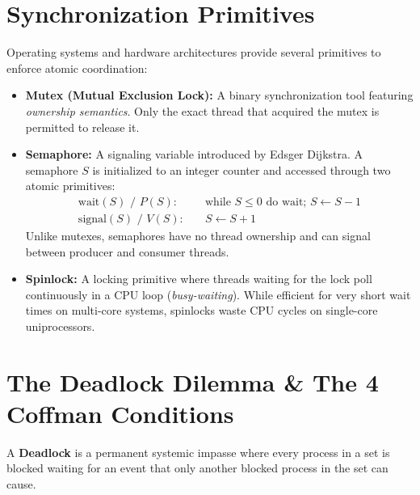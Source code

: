 \documentclass[11pt,a4paper]{article}
\begin{document}
\vspace{10pt}

\section{Synchronization Primitives}

Operating systems and hardware architectures provide several primitives to enforce atomic coordination:

\begin{itemize}[leftmargin=1.5em, itemsep=5pt]
    \item \textbf{Mutex (Mutual Exclusion Lock):} A binary synchronization tool featuring \textit{ownership semantics}. Only the exact thread that acquired the mutex is permitted to release it.
    \item \textbf{Semaphore:} A signaling variable introduced by Edsger Dijkstra. A semaphore $S$ is initialized to an integer counter and accessed through two atomic primitives:
    \begin{align*}
        \text{wait}(S) \text{ / } P(S): & \quad \text{while } S \le 0 \text{ do wait; } S \leftarrow S - 1 \\
        \text{signal}(S) \text{ / } V(S): & \quad S \leftarrow S + 1
    \end{align*}
    Unlike mutexes, semaphores have no thread ownership and can signal between producer and consumer threads.
    \item \textbf{Spinlock:} A locking primitive where threads waiting for the lock poll continuously in a CPU loop (\textit{busy-waiting}). While efficient for very short wait times on multi-core systems, spinlocks waste CPU cycles on single-core uniprocessors.
\end{itemize}

\vspace{10pt}

\section{The Deadlock Dilemma \& The 4 Coffman Conditions}

A \textbf{Deadlock} is a permanent systemic impasse where every process in a set is blocked waiting for an event that only another blocked process in the set can cause.
\end{document}
